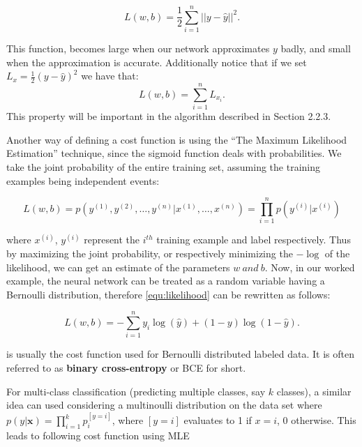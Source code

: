 \begin{equation}
  \label{equ:mse}
  L(w, b) = \frac{1}{2} \sum_{i = 1}^{n} ||y - \hat{y}||^2.
\end{equation}

This function, becomes large when our network approximates $y$ badly, and small when the approximation is accurate. Additionally notice that if we set $L_x = \frac{1}{2} (y - \hat{y})^2$ we have that:
\begin{equation}
  \label{equ:additivity}
  L(w,b) = \sum_{i = 1}^{n} L_{x_{i}}.
\end{equation}
This property will be important in the algorithm described in Section 2.2.3.

Another way of defining a cost function is using the ``The Maximum Likelihood Estimation'' technique, since the sigmoid function deals with probabilities. We take the joint probability of the entire training set, assuming the training examples being independent events:

\begin{equation}
  \label{equ:likelihood}
  L(w, b) = p(y^{(1)}, y^{(2)}, \ldots, y^{(n)} | x^{(1)}, \ldots, x^{(n)}) = \prod_{i=1}^{n} p(y^{(i)}|x^{(i)})
\end{equation}

where $x^{(i)}$, $y^{(i)}$ represent the $i^{th}$ training example and label respectively. Thus by maximizing the joint probability, or respectively minimizing the $-\log$ of the likelihood, we can get an estimate of the parameters $w \ and \ b $. Now, in our worked example, the neural network can be treated as a random variable having a Bernoulli distribution, therefore \cref{equ:likelihood} can be rewritten as follows:

\begin{equation}
  \label{equ:b_likelihood}
  L(w, b) = - \sum_{i = 1}^{n} y_i \log(\hat{y}) + (1 - y) \log(1 - \hat{y}).
\end{equation}

 is usually the cost function used for Bernoulli distributed labeled data. It is often referred to as \textbf{binary cross-entropy} or BCE for short.

For multi-class classification (predicting multiple classes, say $k$ classes), a similar idea can used considering a multinoulli distribution on the data set where $p(y | \textbf{x}) = \prod_{i = 1}^{k} p_i^{[y=i]}$, where $[y = i]$ evaluates to 1 if $x = i$, 0 otherwise. This leads to following cost function using MLE

